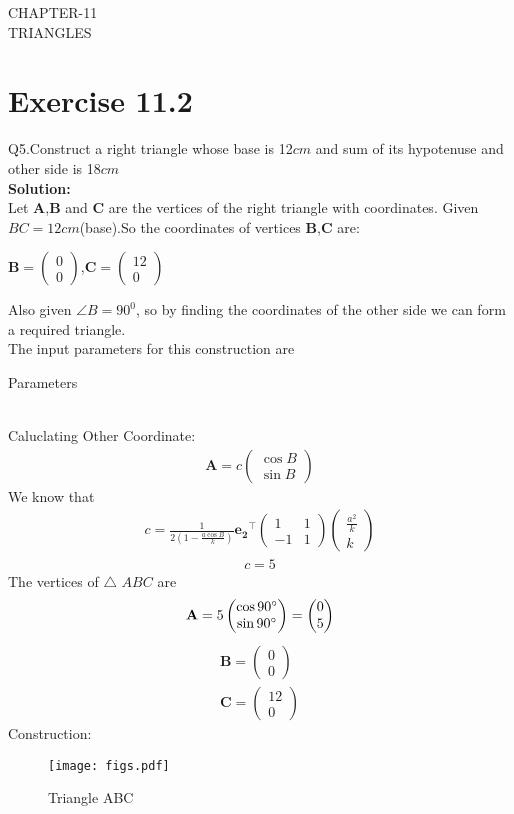 \documentclass{article}
\newcommand{\myvec}[1]{\ensuremath{\begin{pmatrix}#1\end{pmatrix}}}
\let\vec\mathbf
\begin{document}
\begin{center}
        \textbf\large{CHAPTER-11 \\ TRIANGLES}
\end{center}
\section{Exercise 11.2}
Q5.Construct a right triangle whose base is 12$cm$ and sum of its hypotenuse and other side is 18$cm$ \\
\textbf{Solution:}\\
Let $\vec{A}$,$\vec{B}$ and $\vec{C}$ are the vertices of the right triangle with coordinates.
Given $BC=12cm$(base).So the coordinates of vertices $\vec{B}$,$\vec{C}$ are:
\begin{center}
{
$\vec{B} =\myvec{0\\0}$,$\vec{C} =\myvec{12\\0}$
}
\end{center}
Also given $\angle{B}=90^0$, so by finding the coordinates of the other side we can form a required triangle. \\
 The input parameters for this construction are\\
 \begin{table}[h]
   \centering
   
   \caption{Parameters}
   \label{tab:Table1}
\end{table}\\
Caluclating Other Coordinate:\\
  \begin{align}
   \vec{A} = c\myvec{\cos{B}\\\sin{B}}
   \end{align}
We know that\\
\begin{align}  
      c = \frac{1}{2(1-\frac{a\cos{B}}{k})}\vec{e_2}^{\top}\myvec{1 & 1\\-1 & 1}\myvec{\frac{a^2}{k}\\k}
     \end{align}
  \begin{align}
  c = 5
  \end{align}  
The vertices of $\triangle$ $ABC$ are \\
\begin{align}
\vec{A} = 5\myvec{\cos 90\degree\\\sin 90\degree}
  = \myvec{0\\5}
\end{align}
\begin{align}
 \vec{B} = \myvec{0\\0}\\
 \vec{C} = \myvec{12\\0}
 \end{align}        
Construction: \\
\begin{figure}[h]
 \begin{center}
  \texttt{[image: figs.pdf]}
 \end{center}
 \caption{Triangle ABC}
 \label{fig:Fig1}
\end{figure}
\end{document}
